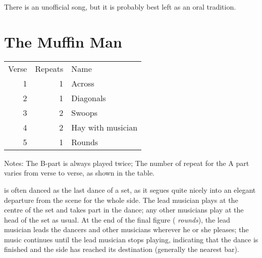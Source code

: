 \documentclass[12pt,a4paper]{article}
\begin{document}
There is an unofficial song, but it is probably best left
as an oral tradition.

\section{The Muffin Man}


\begin{minipage}[t]{7cm}
\vspace{0pt}
\begin{tabular}{rrl}
Verse & Repeats & Name \\
1 & 1 & Across \\
2 & 1 & Diagonals \\
3 & 2 & Swoops \\
4 & 2 & Hay with musician \\
5 & 1 & Rounds \\
\end{tabular}
\end{minipage} \hspace{3mm} \begin{minipage}[t]{9cm}
\vspace{0pt}
\noindent Notes: The B-part is always played twice; The number of
repeat for the A part varies from verse to verse, as shown in the
table.
\end{minipage}

\medskip

 is often danced as the last dance of a
set, as it segues quite nicely into an elegant departure from the
scene for the whole side.  The lead musician plays at the centre of
the set and takes part in the dance; any other musicians play at the
head of the set as usual. At the end of the final figure ({\it
  rounds}), the lead musician leads the dancers and other musicians
wherever he or she pleases; the music continues until the lead
musician stops playing, indicating that the dance is finished and the
side has reached its destination (generally the nearest bar).
\end{document}
